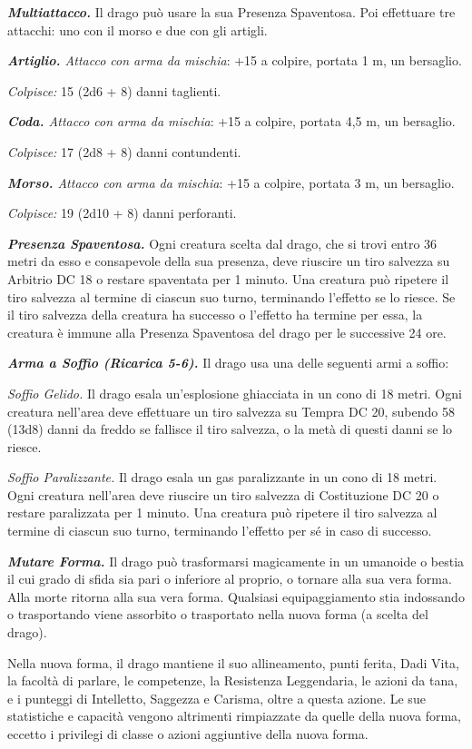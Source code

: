 \begin{multicols}{2}
\emph{\textbf{Multiattacco.}} Il drago può usare la sua Presenza
Spaventosa. Poi effettuare tre attacchi: uno con il morso e due con gli
artigli.

\emph{\textbf{Artiglio.} Attacco con arma da mischia}: +15 a colpire,
portata 1 m, un bersaglio.

\emph{Colpisce:} 15 (2d6 + 8) danni taglienti.

\emph{\textbf{Coda.} Attacco con arma da mischia}: +15 a colpire,
portata 4,5 m, un bersaglio.

\emph{Colpisce:} 17 (2d8 + 8) danni contundenti.

\emph{\textbf{Morso.} Attacco con arma da mischia}: +15 a colpire,
portata 3 m, un bersaglio.

\emph{Colpisce:} 19 (2d10 + 8) danni perforanti.

\emph{\textbf{Presenza Spaventosa.}} Ogni creatura scelta dal drago, che
si trovi entro 36 metri da esso e consapevole della sua presenza, deve
riuscire un tiro salvezza su Arbitrio DC 18 o restare spaventata per 1
minuto. Una creatura può ripetere il tiro salvezza al termine di ciascun
suo turno, terminando l'effetto se lo riesce. Se il tiro salvezza della
creatura ha successo o l'effetto ha termine per essa, la creatura è
immune alla Presenza Spaventosa del drago per le successive 24 ore.

\emph{\textbf{Arma a Soffio (Ricarica 5-6).}} Il drago usa una delle
seguenti armi a soffio:

\emph{Soffio Gelido.} Il drago esala un'esplosione ghiacciata in un cono
di 18 metri. Ogni creatura nell'area deve effettuare un tiro salvezza su Tempra DC 20, subendo 58 (13d8) danni da freddo se fallisce il
tiro salvezza, o la metà di questi danni se lo riesce.

\emph{Soffio Paralizzante.} Il drago esala un gas paralizzante in un
cono di 18 metri. Ogni creatura nell'area deve riuscire un tiro salvezza
di Costituzione DC 20 o restare paralizzata per 1 minuto. Una creatura
può ripetere il tiro salvezza al termine di ciascun suo turno,
terminando l'effetto per sé in caso di successo.

\emph{\textbf{Mutare Forma.}} Il drago può trasformarsi magicamente in
un umanoide o bestia il cui grado di sfida sia pari o inferiore al
proprio, o tornare alla sua vera forma. Alla morte ritorna alla sua vera
forma. Qualsiasi equipaggiamento stia indossando o trasportando viene
assorbito o trasportato nella nuova forma (a scelta del drago).

Nella nuova forma, il drago mantiene il suo allineamento, punti ferita,
Dadi Vita, la facoltà di parlare, le competenze, la Resistenza
Leggendaria, le azioni da tana, e i punteggi di Intelletto, Saggezza e
Carisma, oltre a questa azione. Le sue statistiche e capacità vengono
altrimenti rimpiazzate da quelle della nuova forma, eccetto i privilegi
di classe o azioni aggiuntive della nuova forma.


\end{multicols}
